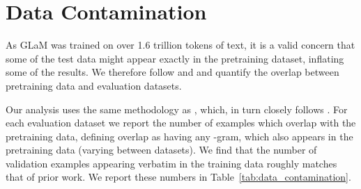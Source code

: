 \documentclass{article}
\begin{document}
\section{Data Contamination}
\label{sec:overlap}

As GLaM was trained on over 1.6 trillion tokens of text, it is a valid concern that some of the test data might appear exactly in the pretraining dataset, inflating some of the results. We therefore follow \citet{NEURIPS2020_gpt3} and \citet{wei2021finetuned} and quantify the overlap between pretraining data and evaluation datasets.

Our analysis uses the same methodology as \citet{wei2021finetuned}, which, in turn closely follows \citet{NEURIPS2020_gpt3}. For each evaluation dataset we report the number of examples which overlap with the pretraining data, defining overlap as having any -gram, which also appears in the pretraining data (varying  between datasets). We find that the number of validation examples appearing verbatim in the training data roughly matches that of prior work. We report these numbers in Table~\ref{tab:data_contamination}.
\end{document}
